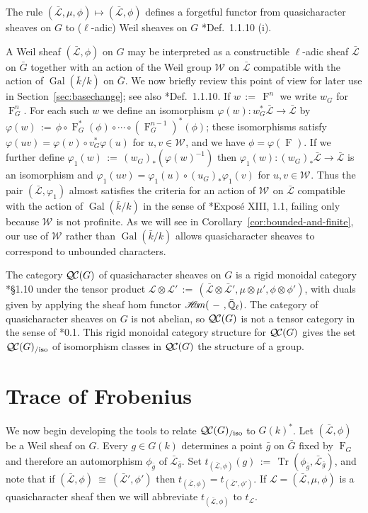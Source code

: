 \documentclass{amsart}
\theoremstyle{plain}
\theoremstyle{definition}
\theoremstyle{remark}
\newcommand{\EE}{\mathbb{\bar Q}_\ell}
\newcommand{\bFq}{\bar{k}}
\newcommand{\Fq}{k}
\newcommand{\Weil}[1]{\mathcal{W}_{#1}}
\DeclareMathOperator{\Gal}{Gal}
\newcommand{\Frob}[1]{\operatorname{F}_{#1}}
\DeclareMathOperator{\trace}{Tr}
\newcommand{\sheafHom}{{\mathscr{H}\hskip-4pt{\it o}\hskip-2pt{\it m}}}
\newcommand{\ceq}{{\, :=\, }}
\newcommand{\iso}{{\ \cong\ }}
\newcommand{\qcs}[1]{{\mathcal{#1}}}
\newcommand{\gqcs}[1]{{\mathcal{\bar #1}}}
\newcommand{\QC}{{\mathcal{Q\hskip-0.8pt C}}}
\newcommand{\QCiso}[1]{\QC(#1)_{/\text{iso}}}
\newcommand{\trFrob}[1]{t_{#1}}
\newcommand{\bg}{\bar{g}}
\newcommand{\bG}{\bar{G}}
\begin{document}
The rule $(\gqcs{L},\mu,\phi) \mapsto (\gqcs{L},\phi)$ defines a forgetful functor from quasicharacter
sheaves on $G$ to ($\ell$-adic) Weil sheaves on $G$ \cite{deligne:80a}*{Def.~1.1.10 (i)}.

A Weil sheaf $(\gqcs{L},\phi)$ on $G$
may be interpreted as a constructible $\ell$-adic sheaf $\gqcs{L}$ on $\bG$ together with
an action of the Weil group $\Weil{}$ on $\gqcs{L}$ compatible with the action of
$\Gal(\bFq/\Fq)$ on $\bG$. We now briefly review this point of view for later use in
Section~\ref{sec:basechange}; see also \cite{deligne:80a}*{Def.~1.1.10}.  If $w \ceq \Frob{}^n$ we write $w_G$ for $\Frob{G}^n$.
For each such $w$ we define an isomorphism $\varphi(w) : w_G^* \gqcs{L}\to \gqcs{L}$ by
$
\varphi(w) \ceq  \phi \circ \Frob{G}^*(\phi) \circ \cdots \circ (\Frob{G}^{n-1})^*(\phi)
$;
these isomorphisms satisfy $\varphi(uv) = \varphi(v) \circ v_G^* \varphi(u)$ for $u,v\in \Weil{}$, and
we have $\phi = \varphi(\Frob{})$.
If we further define $\varphi_1(w) \ceq (w_G)_*(\varphi(w)^{-1})$ then
$\varphi_1(w) : (w_G)_* \gqcs{L}\to \gqcs{L}$ is an isomorphism and
$\varphi_1(uv) = \varphi_1(u) \circ (u_G)_* \varphi_1(v)$ for $u,v\in \Weil{}$.
Thus the pair $(\gqcs{L},\varphi_1)$ almost satisfies the criteria for an action of $\Weil{}$
on $\gqcs{L}$ compatible with the action of $\Gal(\bFq/\Fq)$ in the sense of
\cite{deligne:SGA4.5}*{Expos\'e XIII, 1.1}, failing only because $\Weil{}$ is not profinite.
As we will see in Corollary~\ref{cor:bounded-and-finite}, our use of $\Weil{}$ rather than $\Gal(\bFq/\Fq)$
allows quasicharacter sheaves to correspond to unbounded characters.

The category $\QC(G)$ of quasicharacter sheaves on $G$ is a rigid monoidal category
\cite{etingof:09a}*{\S1.10} under the tensor product
$\qcs{L} \otimes \qcs{L'} \ceq (\gqcs{L}\otimes\gqcs{L'}, \mu\otimes\mu', \phi\otimes \phi')$,
with duals given by applying the sheaf hom functor
$\sheafHom(\ - \ ,\EE)$.
The category of quasicharacter sheaves on $G$ is not abelian, so $\QC(G)$
is not a tensor category in the sense of \cite{deligne:02a}*{0.1}.
This rigid monoidal category structure for $\QC(G)$ gives the set $\QCiso{G}$
of isomorphism classes in $\QC(G)$ the structure of a group.

\section{Trace of Frobenius}\label{sec:Frob}



We now begin developing the tools to relate $\QCiso{G}$ to $G(\Fq)^*$.
%
Let $(\gqcs{L},\phi)$ be a Weil sheaf on $G$. Every $g\in G(\Fq)$
determines a point $\bg$ on $\bG$ fixed by $\Frob{G}$ and
therefore an automorphism $\phi_{\bg}$ of $\gqcs{L}_{\bg}$. Set $\trFrob{(\gqcs{L},\phi)}(g) \ceq \trace(\phi_{\bg}, \gqcs{L}_{\bg})$,
and note that if $(\gqcs{L},\phi) \iso (\gqcs{L'},\phi')$ then $\trFrob{(\gqcs{L},\phi)} = \trFrob{(\gqcs{L'},\phi')}$.
 If $\qcs{L} = (\gqcs{L},\mu,\phi)$ is a quasicharacter sheaf
then we will abbreviate $\trFrob{(\gqcs{L},\phi)}$ to $\trFrob{\qcs{L}}$.
\end{document}
